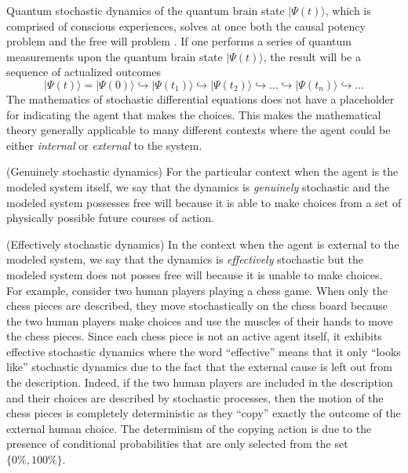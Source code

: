 \documentclass{ws-ijmpb}
\begin{document}
Quantum stochastic dynamics of the quantum brain state $\vert \Psi(t)\rangle$,
which is comprised of conscious experiences, solves at once both the
causal potency problem and the free will problem \cite{Georgiev2021}. If one performs
a series of quantum measurements upon the quantum brain state $\vert \Psi(t)\rangle$,
the result will be a sequence of actualized outcomes
\begin{equation}
\vert \Psi(t)\rangle=\vert \Psi(0)\rangle\hookrightarrow\vert \Psi(t_1)\rangle\hookrightarrow\vert \Psi(t_2)\rangle\hookrightarrow\ldots\hookrightarrow\vert \Psi(t_{n})\rangle\hookrightarrow\ldots\label{eq:12}
\end{equation}
The mathematics of stochastic differential equations does not have
a placeholder for indicating the agent that makes the choices. This
makes the mathematical theory generally applicable to many different
contexts where the agent could be either \emph{internal} or \emph{external}
to the system.

\begin{example}
(Genuinely stochastic dynamics) For the particular context when the
agent is the modeled system itself, we say that the dynamics is \emph{genuinely}
stochastic and the modeled system possesses free will because it is
able to make choices from a set of physically possible future courses
of action.
\end{example}

\begin{example}
(Effectively stochastic dynamics) In the context when the agent is
external to the modeled system, we say that the dynamics is \emph{effectively}
stochastic but the modeled system does not posses free will because
it is unable to make choices. For example, consider two human players
playing a chess game. When only the chess pieces are described, they move stochastically on the
chess board because the two human players make choices and use the
muscles of their hands to move the chess pieces. Since each chess
piece is not an active agent itself, it exhibits effective stochastic
dynamics where the word ``effective'' means that it only ``looks
like'' stochastic dynamics due to the fact that the external
cause is left out from the description. Indeed, if the two human players
are included in the description and their choices are described by stochastic
processes, then the motion of the chess pieces is completely deterministic
as they ``copy'' exactly the outcome of the external human choice. The determinism
of the copying action is due to the presence of conditional probabilities
that are only selected from the set $\{0\%,100\%\}$.
\end{example}
\end{document}
